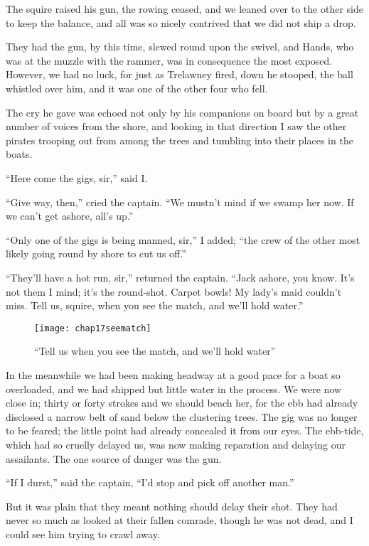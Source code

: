 The squire raised his gun, the rowing ceased, and we leaned over to the other side to keep the balance, and all was so nicely contrived that we did not ship a drop.

They had the gun, by this time, slewed round upon the swivel, and Hands, who was at the muzzle with the rammer, was in consequence the most exposed. However, we had no luck, for just as Trelawney fired, down he stooped, the ball whistled over him, and it was one of the other four who fell.

The cry he gave was echoed not only by his companions on board but by a great number of voices from the shore, and looking in that direction I saw the other pirates trooping out from among the trees and tumbling into their places in the boats.

\enquote{Here come the gigs, sir,} said I.

\enquote{Give way, then,} cried the captain. \enquote{We mustn’t mind if we swamp her now. If we can’t get ashore, all’s up.}

\enquote{Only one of the gigs is being manned, sir,} I added; \enquote{the crew of the other most likely going round by shore to cut us off.}

\enquote{They’ll have a hot run, sir,} returned the captain. \enquote{Jack ashore, you know. It’s not them I mind; it’s the round-shot. Carpet bowls! My lady’s maid couldn’t miss. Tell us, squire, when you see the match, and we’ll hold water.}


  \begin{figure}[p]
\centering
\texttt{[image: chap17seematch]}
\caption{\enquote{Tell us when you see the match, and we’ll hold water}}
\end{figure} 

In the meanwhile we had been making headway at a good pace for a boat so overloaded, and we had shipped but little water in the process. We were now close in; thirty or forty strokes and we should beach her, for the ebb had already disclosed a narrow belt of sand below the clustering trees. The gig was no longer to be feared; the little point had already concealed it from our eyes. The ebb-tide, which had so cruelly delayed us, was now making reparation and delaying our assailants. The one source of danger was the gun.

\enquote{If I durst,} said the captain, \enquote{I’d stop and pick off another man.}

But it was plain that they meant nothing should delay their shot. They had never so much as looked at their fallen comrade, though he was not dead, and I could see him trying to crawl away.

